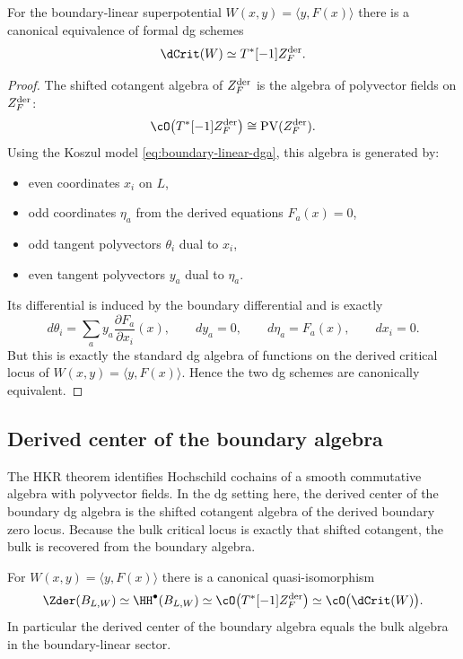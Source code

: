 \begin{theorem}\label{thm:dcrit-shiftedcot}
For the boundary-linear superpotential $W(x,y)=\langle y,F(x)\rangle$ there is a canonical equivalence of formal dg schemes
\[
\dCrit(W)\simeq T^*[-1] Z_F^{\der}.
\]
\end{theorem}

\begin{proof}
The shifted cotangent algebra of $Z_F^{\mathrm{der}}$ is the algebra of polyvector fields on $Z_F^{\mathrm{der}}$:
\[
\cO\bigl(T^*[-1]Z_F^{\der}\bigr)\cong \PV(Z_F^{\der}).
\]
Using the Koszul model \eqref{eq:boundary-linear-dga}, this algebra is generated by:
\begin{itemize}[leftmargin=1.8em]
\item even coordinates $x_i$ on $L$,
\item odd coordinates $\eta_a$ from the derived equations $F_a(x)=0$,
\item odd tangent polyvectors $\theta_i$ dual to $x_i$,
\item even tangent polyvectors $y_a$ dual to $\eta_a$.
\end{itemize}
Its differential is induced by the boundary differential and is exactly
\[
d\theta_i
=
\sum_a y_a\frac{\partial F_a}{\partial x_i}(x),
\qquad
dy_a=0,
\qquad
d\eta_a=F_a(x),
\qquad
dx_i=0.
\]
But this is exactly the standard dg algebra of functions on the derived critical locus of $W(x,y)=\langle y,F(x)\rangle$. Hence the two dg schemes are canonically equivalent.
\end{proof}

\subsection{Derived center of the boundary algebra}

The HKR theorem identifies Hochschild cochains of a smooth commutative algebra with polyvector fields. In the dg setting here, the derived center of the boundary dg algebra is the shifted cotangent algebra of the derived boundary zero locus. Because the bulk critical locus is exactly that shifted cotangent, the bulk is recovered from the boundary algebra.

\begin{theorem}\label{thm:boundary-linear-bulk-boundary}
For $W(x,y)=\langle y,F(x)\rangle$ there is a canonical quasi-isomorphism
\[
\Zder(B_{L,W})
\simeq
\HH^\bullet(B_{L,W})
\simeq
\cO\bigl(T^*[-1]Z_F^{\der}\bigr)
\simeq
\cO\bigl(\dCrit(W)\bigr).
\]
In particular the derived center of the boundary algebra equals the bulk algebra in the boundary-linear sector.
\end{theorem}

